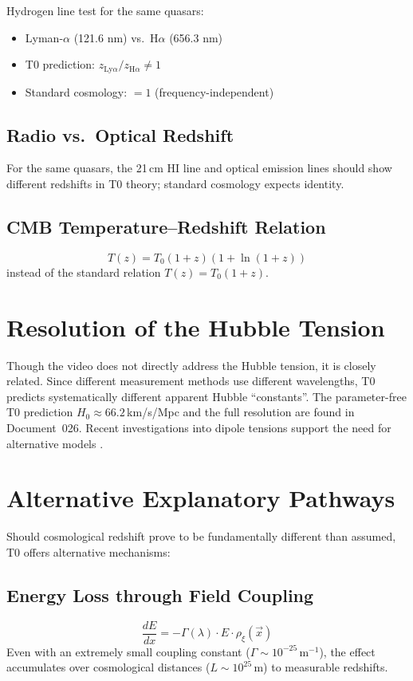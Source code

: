 	Hydrogen line test for the same quasars:
	\begin{itemize}
		\item Lyman-$\alpha$ (121.6 nm) vs.\ H$\alpha$ (656.3 nm)
		\item T0 prediction: $z_{\mathrm{Ly}\alpha} / z_{\mathrm{H}\alpha} \neq 1$
		\item Standard cosmology: $= 1$ (frequency-independent)
	\end{itemize}

	\subsection{Radio vs.\ Optical Redshift}
	For the same quasars, the 21\,cm HI line and optical emission lines should show different redshifts in T0 theory; standard cosmology expects identity.

	\subsection{CMB Temperature--Redshift Relation}
	$$T(z) = T_0(1+z)(1+\ln(1+z))$$
	instead of the standard relation $T(z) = T_0(1+z)$.

\section{Resolution of the Hubble Tension}

	Though the video does not directly address the Hubble tension, it is closely related. Since different measurement methods use different wavelengths, T0 predicts systematically different apparent Hubble ``constants''. The parameter-free T0 prediction $H_0 \approx 66.2\,$km/s/Mpc and the full resolution are found in Document~026. Recent investigations into dipole tensions support the need for alternative models \cite{landstry2025, bengaly2025}.

\section{Alternative Explanatory Pathways}

	Should cosmological redshift prove to be fundamentally different than assumed, T0 offers alternative mechanisms:

	\subsection{Energy Loss through Field Coupling}
	\begin{equation}
		\frac{dE}{dx} = -\Gamma(\lambda) \cdot E \cdot \rho_\xi(\vec{x})
	\end{equation}
	Even with an extremely small coupling constant ($\Gamma \sim 10^{-25}\,\text{m}^{-1}$), the effect accumulates over cosmological distances ($L \sim 10^{25}\,$m) to measurable redshifts.

